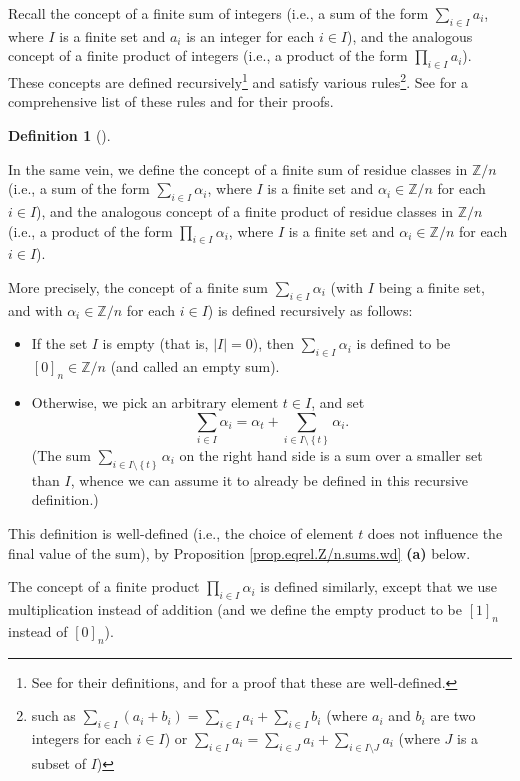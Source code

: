 \documentclass[numbers=enddot,12pt,final,onecolumn,notitlepage]{scrartcl}%
\numberwithin{exer}{subsection}
\theoremstyle{definition}
\newtheorem{defi}[theo]{Definition}
\newenvironment{definition}[1][]
{\begin{defi}[#1]\begin{leftbar}}
{\end{leftbar}\end{defi}}
\let\sumnonlimits\sum
\let\prodnonlimits\prod
\renewcommand{\sum}{\sumnonlimits\limits}
\renewcommand{\prod}{\prodnonlimits\limits}
\begin{document}
Recall the concept of a finite sum of integers (i.e., a sum of the form
$\sum_{i\in I}a_{i}$, where $I$ is a finite set and $a_{i}$ is an integer for
each $i\in I$), and the analogous concept of a finite product of integers
(i.e., a product of the form $\prod_{i\in I}a_{i}$). These concepts are
defined recursively\footnote{See \cite[\S 1.4.1 and \S 1.4.3]{detnotes} for
their definitions, and \cite[\S 2.14]{detnotes} for a proof that these are
well-defined.} and satisfy various rules\footnote{such as $\sum_{i\in
I}\left(  a_{i}+b_{i}\right)  =\sum_{i\in I}a_{i}+\sum_{i\in I}b_{i}$ (where
$a_{i}$ and $b_{i}$ are two integers for each $i\in I$) or $\sum_{i\in I}%
a_{i}=\sum_{i\in J}a_{i}+\sum_{i\in I\setminus J}a_{i}$ (where $J$ is a subset
of $I$)}. See \cite[\S 1.4]{detnotes} for a comprehensive list of these rules
and \cite[\S 2.14]{detnotes} for their proofs.

\begin{definition}
\label{def.eqrel.Z/n.sums}In the same vein, we define the concept of a finite
sum of residue classes in $\mathbb{Z}/n$ (i.e., a sum of the form $\sum_{i\in
I}\alpha_{i}$, where $I$ is a finite set and $\alpha_{i}\in\mathbb{Z}/n$ for
each $i\in I$), and the analogous concept of a finite product of residue
classes in $\mathbb{Z}/n$ (i.e., a product of the form $\prod_{i\in I}%
\alpha_{i}$, where $I$ is a finite set and $\alpha_{i}\in\mathbb{Z}/n$ for
each $i\in I$).

More precisely, the concept of a finite sum $\sum_{i\in I}\alpha_{i}$ (with
$I$ being a finite set, and with $\alpha_{i}\in\mathbb{Z}/n$ for each $i\in
I$) is defined recursively as follows:

\begin{itemize}
\item If the set $I$ is empty (that is, $\left\vert I\right\vert =0$), then
$\sum_{i\in I}\alpha_{i}$ is defined to be $\left[  0\right]  _{n}%
\in\mathbb{Z}/n$ (and called an empty sum).

\item Otherwise, we pick an arbitrary element $t\in I$, and set%
\[
\sum_{i\in I}\alpha_{i}=\alpha_{t}+\sum_{i\in I\setminus\left\{  t\right\}
}\alpha_{i}.
\]
(The sum $\sum_{i\in I\setminus\left\{  t\right\}  }\alpha_{i}$ on the right
hand side is a sum over a smaller set than $I$, whence we can assume it to
already be defined in this recursive definition.)
\end{itemize}

This definition is well-defined (i.e., the choice of element $t$ does not
influence the final value of the sum), by Proposition
\ref{prop.eqrel.Z/n.sums.wd} \textbf{(a)} below.

The concept of a finite product $\prod_{i\in I}\alpha_{i}$ is defined
similarly, except that we use multiplication instead of addition (and we
define the empty product to be $\left[  1\right]  _{n}$ instead of $\left[
0\right]  _{n}$).
\end{definition}
\end{document}
